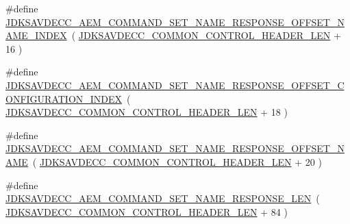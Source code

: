 \begin{DoxyCompactItemize}
\item 
\#define \hyperlink{group__command__set__name__response_ga54ea04534002a4259f8d2b671cb3ae5f}{J\+D\+K\+S\+A\+V\+D\+E\+C\+C\+\_\+\+A\+E\+M\+\_\+\+C\+O\+M\+M\+A\+N\+D\+\_\+\+S\+E\+T\+\_\+\+N\+A\+M\+E\+\_\+\+R\+E\+S\+P\+O\+N\+S\+E\+\_\+\+O\+F\+F\+S\+E\+T\+\_\+\+N\+A\+M\+E\+\_\+\+I\+N\+D\+EX}~( \hyperlink{group__jdksavdecc__avtp__common__control__header_gaae84052886fb1bb42f3bc5f85b741dff}{J\+D\+K\+S\+A\+V\+D\+E\+C\+C\+\_\+\+C\+O\+M\+M\+O\+N\+\_\+\+C\+O\+N\+T\+R\+O\+L\+\_\+\+H\+E\+A\+D\+E\+R\+\_\+\+L\+EN} + 16 )
\item 
\#define \hyperlink{group__command__set__name__response_ga1e3553576702f286b6c0a714b06fa61d}{J\+D\+K\+S\+A\+V\+D\+E\+C\+C\+\_\+\+A\+E\+M\+\_\+\+C\+O\+M\+M\+A\+N\+D\+\_\+\+S\+E\+T\+\_\+\+N\+A\+M\+E\+\_\+\+R\+E\+S\+P\+O\+N\+S\+E\+\_\+\+O\+F\+F\+S\+E\+T\+\_\+\+C\+O\+N\+F\+I\+G\+U\+R\+A\+T\+I\+O\+N\+\_\+\+I\+N\+D\+EX}~( \hyperlink{group__jdksavdecc__avtp__common__control__header_gaae84052886fb1bb42f3bc5f85b741dff}{J\+D\+K\+S\+A\+V\+D\+E\+C\+C\+\_\+\+C\+O\+M\+M\+O\+N\+\_\+\+C\+O\+N\+T\+R\+O\+L\+\_\+\+H\+E\+A\+D\+E\+R\+\_\+\+L\+EN} + 18 )
\item 
\#define \hyperlink{group__command__set__name__response_ga4845fdb88255fc99d6e6bb3ad3a7dd74}{J\+D\+K\+S\+A\+V\+D\+E\+C\+C\+\_\+\+A\+E\+M\+\_\+\+C\+O\+M\+M\+A\+N\+D\+\_\+\+S\+E\+T\+\_\+\+N\+A\+M\+E\+\_\+\+R\+E\+S\+P\+O\+N\+S\+E\+\_\+\+O\+F\+F\+S\+E\+T\+\_\+\+N\+A\+ME}~( \hyperlink{group__jdksavdecc__avtp__common__control__header_gaae84052886fb1bb42f3bc5f85b741dff}{J\+D\+K\+S\+A\+V\+D\+E\+C\+C\+\_\+\+C\+O\+M\+M\+O\+N\+\_\+\+C\+O\+N\+T\+R\+O\+L\+\_\+\+H\+E\+A\+D\+E\+R\+\_\+\+L\+EN} + 20 )
\item 
\#define \hyperlink{group__command__set__name__response_ga96ac430b10ef061e0be85f7a77bc3c6f}{J\+D\+K\+S\+A\+V\+D\+E\+C\+C\+\_\+\+A\+E\+M\+\_\+\+C\+O\+M\+M\+A\+N\+D\+\_\+\+S\+E\+T\+\_\+\+N\+A\+M\+E\+\_\+\+R\+E\+S\+P\+O\+N\+S\+E\+\_\+\+L\+EN}~( \hyperlink{group__jdksavdecc__avtp__common__control__header_gaae84052886fb1bb42f3bc5f85b741dff}{J\+D\+K\+S\+A\+V\+D\+E\+C\+C\+\_\+\+C\+O\+M\+M\+O\+N\+\_\+\+C\+O\+N\+T\+R\+O\+L\+\_\+\+H\+E\+A\+D\+E\+R\+\_\+\+L\+EN} + 84 )
\end{DoxyCompactItemize}
